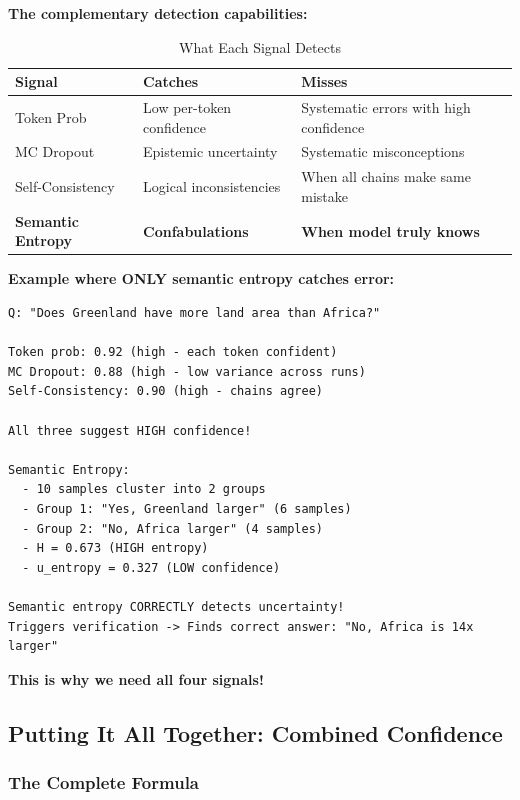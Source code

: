 \documentclass[12pt,a4paper]{article}
\theoremstyle{definition}
\begin{document}
\begin{keyinsightbox}
\textbf{The complementary detection capabilities:}

\begin{table}[h]
\centering
\caption{What Each Signal Detects}
\small
\begin{tabular}{lp{4cm}p{4.5cm}}
\toprule
\textbf{Signal} & \textbf{Catches} & \textbf{Misses} \\
\midrule
Token Prob & Low per-token confidence & Systematic errors with high confidence \\
MC Dropout & Epistemic uncertainty & Systematic misconceptions \\
Self-Consistency & Logical inconsistencies & When all chains make same mistake \\
\textbf{Semantic Entropy} & \textbf{Confabulations} & \textbf{When model truly knows} \\
\bottomrule
\end{tabular}
\end{table}

\textbf{Example where ONLY semantic entropy catches error:}

\begin{verbatim}
Q: "Does Greenland have more land area than Africa?"

Token prob: 0.92 (high - each token confident)
MC Dropout: 0.88 (high - low variance across runs)
Self-Consistency: 0.90 (high - chains agree)

All three suggest HIGH confidence!

Semantic Entropy:
  - 10 samples cluster into 2 groups
  - Group 1: "Yes, Greenland larger" (6 samples)
  - Group 2: "No, Africa larger" (4 samples)
  - H = 0.673 (HIGH entropy)
  - u_entropy = 0.327 (LOW confidence)

Semantic entropy CORRECTLY detects uncertainty!
Triggers verification -> Finds correct answer: "No, Africa is 14x larger"
\end{verbatim}

\textbf{This is why we need all four signals!}
\end{keyinsightbox}

\subsection{Putting It All Together: Combined Confidence}

\subsubsection{The Complete Formula}
\end{document}
